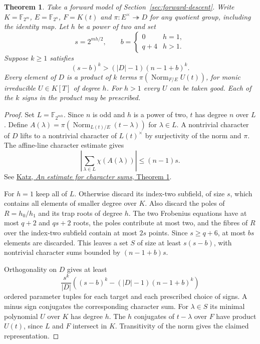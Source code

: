 \documentclass[11pt]{article}
\newtheorem{theorem}{Theorem}
\begin{document}
\begin{theorem}
Take a forward model of Section~\ref{sec:forward-descent}. Write
\(K=\mathbb F_{2^m}\), \(E=\mathbb F_{2^n}\), \(F=K(t)\) and
\(\pi:E^\times\twoheadrightarrow D\) for any quotient group, including
the identity map. Let \(h\) be a power of two and set
\[
   s=2^{mh/2},\qquad
   b=\begin{cases}0&h=1,\\q+4&h>1.\end{cases}
\]
Suppose \(k\ge1\) satisfies
\[
                  (s-b)^k>(|D|-1)(n-1+b)^k .
\]
Every element of \(D\) is a product of \(k\) terms
\(\pi(\operatorname{Norm}_{F/E} U(t))\), for monic irreducible
\(U\in K[T]\) of degree \(h\). For \(h>1\) every \(U\) can be taken
good. Each of the \(k\) signs in the product may be prescribed.
\end{theorem}
\begin{proof}
Set \(L=\mathbb F_{2^{mh}}\). Since \(n\) is odd and \(h\) is a power
of two, \(t\) has degree \(n\) over \(L\). Define
\(A(\lambda)=\pi(\operatorname{Norm}_{L(t)/E}(t-\lambda))\) for
\(\lambda\in L\). A nontrivial character of \(D\) lifts to a nontrivial
character of \(L(t)^\times\) by surjectivity of the norm and \(\pi\).
The affine-line character estimate gives
\[
       \left|\sum_{\lambda\in L}\chi(A(\lambda))\right|\le(n-1)s .
\]
See \href{https://web.math.princeton.edu/~nmk/old/estcharsums.pdf}
{Katz, \emph{An estimate for character sums}, Theorem 1}.

For \(h=1\) keep all of \(L\). Otherwise discard its index-two
subfield, of size \(s\), which contains all elements of smaller
degree over \(K\). Also discard the poles of \(R=h_0/h_1\) and its
trap roots of degree \(h\). The two Frobenius equations have at most
\(q+2\) and \(qs+2\) roots, the poles contribute at most two,
and the fibres of \(R\) over the index-two subfield contain at most
\(2s\) points. Since \(s\ge q+6\), at most \(bs\) elements are
discarded. This leaves a set \(S\) of size at least \(s(s-b)\),
with nontrivial character sums bounded by \((n-1+b)s\).

Orthogonality on \(D\) gives at least
\[
  \frac{s^k}{|D|}
    \left((s-b)^k-(|D|-1)(n-1+b)^k\right)
\]
ordered parameter tuples for each target and each prescribed choice
of signs. A minus sign conjugates the corresponding character sum.
For \(\lambda\in S\) its minimal polynomial \(U\) over \(K\) has
degree \(h\). The \(h\) conjugates of \(t-\lambda\) over \(F\)
have product \(U(t)\), since \(L\) and \(F\) intersect in \(K\).
Transitivity of the norm gives the claimed representation.
\end{proof}
\end{document}
